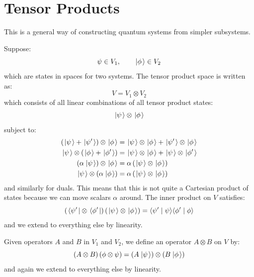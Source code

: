 \documentclass[../Main.tex]{subfiles}
\begin{document}
\section{Tensor Products}
This is a general way of constructing quantum systems from simpler subsystems.

Suppose:
\begin{equation*}
    \psi \in V_1,\qquad\ket\phi \in V_2
\end{equation*}
which are states in spaces for two systems. The tensor product space is written as:
\begin{equation*}
    V = V_1 \otimes V_2
\end{equation*}
which consists of all linear combinations of all tensor product states:
\begin{equation*}
    \state \otimes \ket\phi
\end{equation*}
subject to:
\begin{align*}
    \left(\state + \ket{\psi'}\right) \otimes \ket\phi &= \state \otimes \ket\phi + \ket{\psi'} \otimes \ket{\phi} \\
    \state \otimes \left(\ket{\phi} + \ket{\phi'}\right) &= \state \otimes \ket\phi + \state \otimes \ket{\phi'} \\
    \left(\alpha \state\right) \otimes \ket\phi &= \alpha \left(\state \otimes \ket\phi\right) \\
    \state \otimes \left(\alpha \ket\phi\right)&= \alpha \left(\state \otimes \ket\phi\right)
\end{align*}
and similarly for duals. This means that this is not quite a Cartesian product of states because we can move scalars $\alpha$ around. The inner product on $V$ satisfies:
\begin{equation*}
    \left(\bra{\psi'} \otimes \bra{\phi'}\right) \left(\state \otimes \ket\phi\right) = \inn{\psi'}{\psi} \inn{\phi'}{\phi}
\end{equation*}
and we extend to everything else by linearity.

Given operators $A$ and $B$ in $V_1$ and $V_2$, we define an operator $A \otimes B$ on $V$ by:
\begin{equation*}
    \left(A\otimes B\right)\left(\phi \otimes \psi\right) = \left(A\state\right)\otimes (B\ket{\phi})
\end{equation*}
and again we extend to everything else by linearity.
\end{document}
